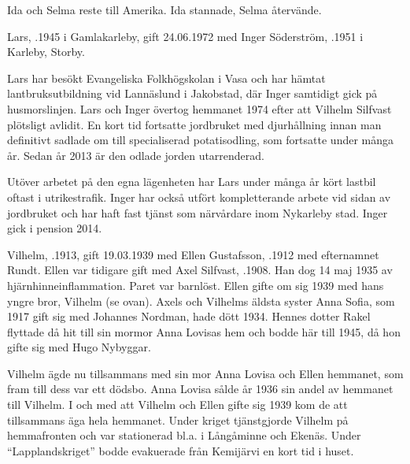 Ida och Selma reste till Amerika. Ida stannade, Selma återvände.




Lars, .1945 i Gamlakarleby, gift 24.06.1972 med Inger Söderström, .1951 i Karleby, Storby.
\begin{jhchildren}
  \item {}
  \item {}
  \item {}
\end{jhchildren}

Lars har besökt Evangeliska Folkhögskolan i Vasa och har hämtat lantbruksutbildning vid Lannäslund i Jakobstad, där Inger samtidigt gick på husmorslinjen. Lars och Inger övertog hemmanet 1974 efter att Vilhelm Silfvast plötsligt avlidit. En kort tid fortsatte jordbruket med djurhållning innan man definitivt sadlade om till specialiserad potatisodling, som  fortsatte under många år. Sedan år 2013  är den odlade jorden utarrenderad.


Utöver arbetet på den egna lägenheten har Lars under många år kört lastbil oftast i utrikestrafik. Inger har också utfört kompletterande arbete vid sidan av jordbruket och har haft fast tjänst som närvårdare inom Nykarleby stad. Inger gick i pension 2014.



Vilhelm, .1913, gift 19.03.1939 med Ellen Gustafsson, .1912 med efternamnet Rundt. Ellen var tidigare gift med Axel Silfvast, .1908. Han dog 14 maj 1935 av hjärnhinneinflammation. Paret var barnlöst. Ellen gifte om sig 1939 med hans yngre bror, Vilhelm (se ovan). Axels och Vilhelms äldsta syster Anna Sofia, som 1917 gift sig med Johannes Nordman, hade dött 1934. Hennes dotter Rakel flyttade då hit till sin mormor Anna Lovisas hem och bodde här till 1945, då hon gifte sig med Hugo Nybyggar.

Vilhelm ägde nu tillsammans med sin mor Anna Lovisa och Ellen hemmanet, som fram till dess var ett dödsbo. Anna Lovisa sålde år 1936 sin andel av hemmanet till Vilhelm. I och med att Vilhelm och Ellen gifte sig 1939 kom de att tillsammans äga hela hemmanet. Under kriget tjänstgjorde Vilhelm på hemmafronten och var stationerad bl.a. i Långåminne och Ekenäs. Under ``Lapplandskriget'' bodde evakuerade från Kemijärvi en kort tid  i huset.

